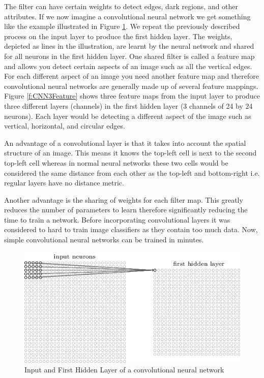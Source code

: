 \documentclass{bhamthesis}
\theoremstyle{definition}
\begin{document}
The filter can have certain weights to detect edges, dark regions, and other attributes. If we now imagine a convolutional neural network we get something like the example illustrated in Figure \ref{f:CNNInput}. We repeat the previously described process on the input layer to produce the first hidden layer. The weights, depicted as lines in the illustration, are learnt by the neural network and shared for all neurons in the first hidden layer. One shared filter is called a feature map and allows you detect certain aspects of an image such as all the vertical edges. For each different aspect of an image you need another feature map and therefore convolutional neural networks are generally made up of several feature mappings. Figure \ref{f:CNN3Feature} shows three feature maps from the input layer to produce three different layers (channels) in the first hidden layer (3 channels of 24 by 24 neurons). Each layer would be detecting a different aspect of the image such as vertical, horizontal, and circular edges.

An advantage of a convolutional layer is that it takes into account the spatial structure of an image. This means it knows the top-left cell is next to the second top-left cell whereas in normal neural networks these two cells would be considered the same distance from each other as the top-left and bottom-right i.e. regular layers have no distance metric.

Another advantage is the sharing of weights for each filter map. This greatly reduces the number of parameters to learn therefore significantly reducing the time to train a network. Before incorporating convolutional layers it was considered to hard to train image classifiers as they contain too much data. Now, simple convolutional neural networks can be trained in minutes.

\begin{figure}
	\includegraphics[width=\textwidth]{media/img/cnnInputAndHidden}
	\caption{Input and First Hidden Layer of a convolutional neural network \cite{Neilsen2015}}\label{f:CNNInput}
\end{figure}
\end{document}
